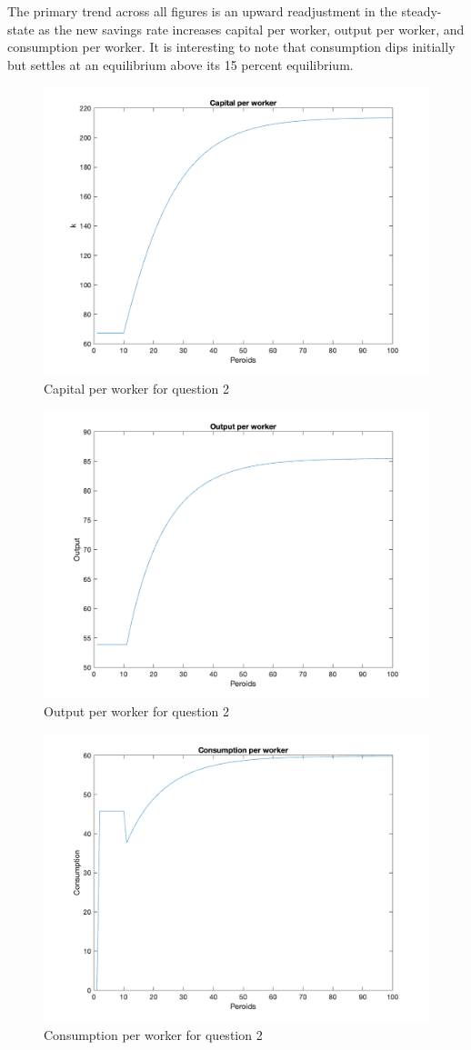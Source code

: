 \documentclass[12pt,oneside,reqno]{amsart}
\begin{document}
\begin{enumerate}
    The primary trend across all figures is an upward readjustment in the steady-state as the new savings rate increases capital per worker, output per worker, and consumption per worker. It is interesting to note that consumption dips initially but settles at an equilibrium above its 15 percent equilibrium.
    
    \begin{figure}[H]
        \centering
        \includegraphics[width =.5\linewidth]{HW1/pics/HW1_Q2_a.png}
        \caption{Capital per worker for question 2}
    \end{figure}
    \vspace{-.5cm}
    \begin{figure}[H]
        \centering
        \includegraphics[width =.5\linewidth]{HW1/pics/HW1_Q2_b.png}
        \caption{Output per worker for question 2}
    \end{figure}
    \begin{figure}[H]
        \centering
        \includegraphics[width =.5\linewidth]{HW1/pics/HW1_Q2_c.png}
        \caption{Consumption per worker for question 2}

\end{figure}
\end{enumerate}
\end{document}

